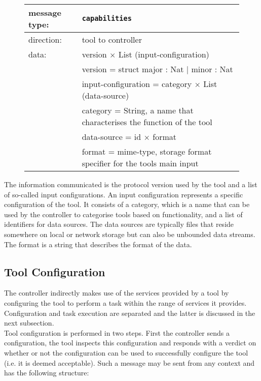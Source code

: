 \documentclass{article}
\newcommand{\msg}[1]{\texttt{#1}}
\begin{document}
   \begin{figure}[H]
    \begin{tabular}{|ll|}
     \hline
      message type:   & \msg{capabilities} \\
     \hline
      direction:      & tool to controller \\
      data:           & version $\times$ List (input-configuration) \\
                      &  version             = struct major : Nat $|$ minor : Nat \\
                      &  input-configuration = category $\times$ List (data-source) \\
                      &  category            = String,   a name that characterises the function of the tool \\
                      &  data-source         = id $\times$ format \\
                      &  format              = mime-type, storage format specifier for the tools main input \\
     \hline
    \end{tabular}
   \end{figure}

   The information communicated is the protocol version used by the tool and a
   list of so-called input configurations. An input configuration represents a
   specific configuration of the tool. It consists of a category, which is a
   name that can be used by the controller to categorise tools based on
   functionality, and a list of identifiers for data sources. The data sources
   are typically files that reside somewhere on local or network storage but
   can also be unbounded data streams. The format is a string that describes
   the format of the data.

  \subsection{Tool Configuration}

   The controller indirectly makes use of the services provided by a tool by
   configuring the tool to perform a task within the range of services it
   provides. Configuration and task execution are separated and the latter is
   discussed in the next subsection.
   \\[4pt]
   Tool configuration is performed in two steps. First the controller sends a
   configuration, the tool inspects this configuration and responds with a
   verdict on whether or not the configuration can be used to successfully
   configure the tool (i.e. it is deemed acceptable). Such a message may be
   sent from any context and has the following structure:
   
\end{document}
